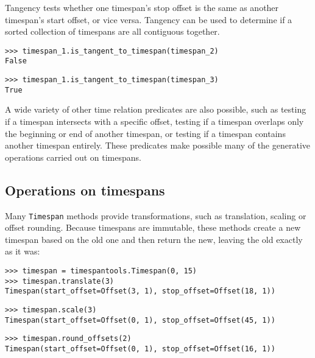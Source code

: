 \noindent Tangency tests whether one timespan's stop offset is the same as
another timespan's start offset, or vice versa. Tangency can be used to
determine if a sorted collection of timespans are all contiguous together.

\begin{comment}
<abjad>
timespan_1.is_tangent_to_timespan(timespan_2)
timespan_1.is_tangent_to_timespan(timespan_3)
</abjad>
\end{comment}

\begin{singlespacing}
\vspace{-0.5\baselineskip}
\begin{lstlisting}
>>> timespan_1.is_tangent_to_timespan(timespan_2)
False
\end{lstlisting}
\begin{lstlisting}
>>> timespan_1.is_tangent_to_timespan(timespan_3)
True
\end{lstlisting}
\end{singlespacing}

\noindent A wide variety of other time relation predicates are also possible,
such as testing if a timespan intersects with a specific offset, testing if a
timespan overlaps only the beginning or end of another timespan, or testing if
a timespan contains another timespan entirely. These predicates make possible
many of the generative operations carried out on timespans.

\subsection{Operations on timespans} %

Many \texttt{Timespan} methods provide transformations, such as translation,
scaling or offset rounding. Because timespans are immutable, these methods
create a new timespan based on the old one and then return the new, leaving
the old exactly as it was:

\begin{comment}
<abjad>
timespan = timespantools.Timespan(0, 15)
timespan.translate(3)
timespan.scale(3)
timespan.round_offsets(2)
</abjad>
\end{comment}

\begin{singlespacing}
\vspace{-0.5\baselineskip}
\begin{lstlisting}
>>> timespan = timespantools.Timespan(0, 15)
>>> timespan.translate(3)
Timespan(start_offset=Offset(3, 1), stop_offset=Offset(18, 1))
\end{lstlisting}
\begin{lstlisting}
>>> timespan.scale(3)
Timespan(start_offset=Offset(0, 1), stop_offset=Offset(45, 1))
\end{lstlisting}
\begin{lstlisting}
>>> timespan.round_offsets(2)
Timespan(start_offset=Offset(0, 1), stop_offset=Offset(16, 1))
\end{lstlisting}
\end{singlespacing}

